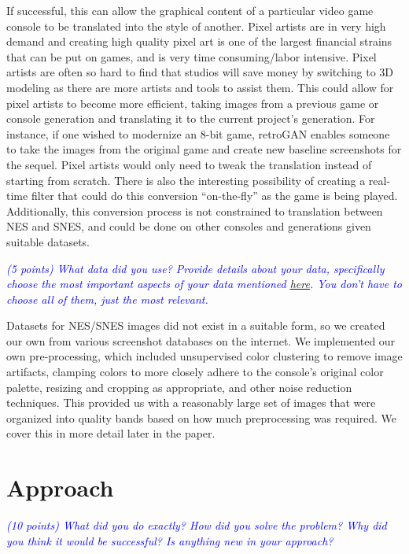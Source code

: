 \documentclass[10pt,twocolumn,letterpaper]{article}
\begin{document}
If successful, this can allow the graphical content of a particular video game console to be translated into the style of another. Pixel artists are in very high demand and creating high quality pixel art is one of the largest financial strains that can be put on games, and is very time consuming/labor intensive. Pixel artists are often so hard to find that studios will save money by switching to 3D modeling as there are more artists and tools to assist them. This could allow for pixel artists to become more efficient, taking images from a previous game or console generation and translating it to the current project's generation. For instance, if one wished to modernize an 8-bit game, retroGAN enables someone to take the images from the original game and create new baseline screenshots for the sequel. Pixel artists would only need to tweak the translation instead of starting from scratch. There is also the interesting possibility of creating a real-time filter that could do this conversion ``on-the-fly'' as the game is being played. Additionally, this conversion process is not constrained to translation between NES and SNES, and could be done on other consoles and generations given suitable datasets.

\textit{\textcolor{blue}{(5 points) What data did you use? Provide details about your data, specifically choose the most important aspects of your data mentioned \href{https://arxiv.org/abs/1803.09010}{here}. You don’t have to choose all of them, just the most relevant.}}

Datasets for NES/SNES images did not exist in a suitable form, so we created our own from various screenshot databases on the internet. We implemented our own pre-processing, which included unsupervised color clustering to remove image artifacts, clamping colors to more closely adhere to the console's original color palette, resizing and cropping as appropriate, and other noise reduction techniques. This provided us with a reasonably large set of images that were organized into quality bands based on how much preprocessing was required. We cover this in more detail later in the paper.

\section{Approach}

\textit{\textcolor{blue}{(10 points) What did you do exactly? How did you solve the problem? Why did you think it would be successful? Is anything new in your approach?}}
\end{document}
